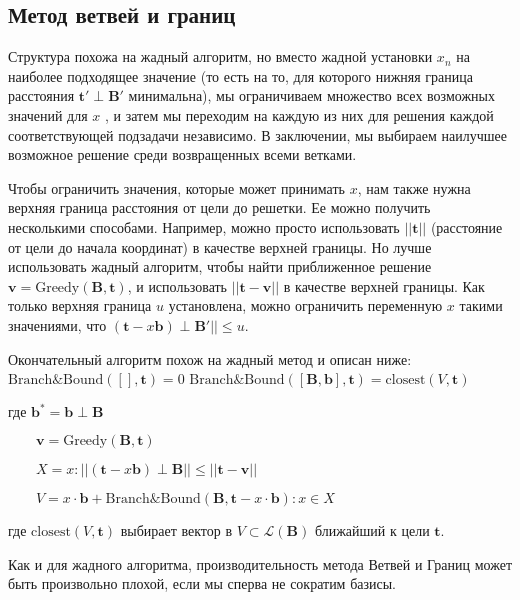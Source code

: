 \subsection{Метод ветвей и границ}

Структура похожа на жадный алгоритм, но вместо жадной установки $ x_n $ на наиболее подходящее значение (то есть на то, для которого нижняя граница расстояния $ \mathbf{t}' \perp \mathbf{B}' $ минимальна), мы ограничиваем множество всех возможных значений для $ x $ , и затем мы переходим на каждую из них для решения каждой соответствующей подзадачи независимо. В заключении, мы выбираем наилучшее возможное решение среди возвращенных всеми ветками.

Чтобы ограничить значения, которые может принимать $ x $, нам также нужна верхняя граница расстояния от цели до решетки. Ее можно получить несколькими способами. Например, можно просто использовать $ ||\mathbf{t} || $ (расстояние от цели до начала координат) в качестве верхней границы. Но лучше использовать жадный алгоритм, чтобы найти приближенное решение $ \mathbf{v} = \text{Greedy}(\mathbf{B}, \mathbf{t}) $, и использовать $ || \mathbf{t} - \mathbf{v} || $ в качестве верхней границы. Как только верхняя граница $ u $  установлена, можно ограничить переменную $ x $ такими значениями, что $ (\mathbf{t} - x\mathbf{b}) \perp \mathbf{B}' || \leq u $.

Окончательный алгоритм похож на жадный метод и описан ниже: \newline
$ \text{Branch\&Bound}([], \mathbf{t}) = 0 $ \newline
$ \text{Branch\&Bound}([\mathbf{B}, \mathbf{b}], \mathbf{t}) = \text{closest}(V,\textbf{t})  $ 

$ \text{где } \mathbf{b}^* = \mathbf{b} \perp \mathbf{B} $ 

$ \qquad \mathbf{v} = \text{Greedy}(\mathbf{B},\mathbf{t}) $

$ \qquad X = {x: || (\mathbf{t} - x\mathbf{b}) \perp \mathbf{B} || \leq || \mathbf{t} - \mathbf{v} ||} $

$ \qquad V = {x \cdot \mathbf{b} + \text{Branch\&Bound}(\mathbf{B},\mathbf{t} - x \cdot \mathbf{b}):x \in X} $

где $ \text{closest}(V, \mathbf{t}) $ выбирает вектор в $ V \subset \mathcal{L}(\mathbf{B}) $ ближайший к цели $ \mathbf{t} $.  

Как и для жадного алгоритма, производительность метода Ветвей и Границ может быть произвольно плохой, если мы сперва не сократим базисы.

